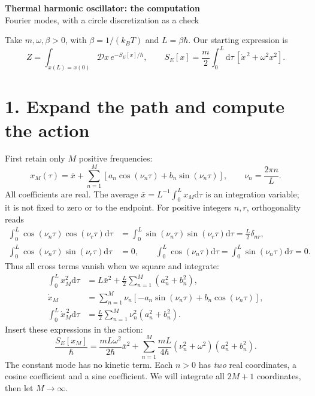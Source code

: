 \documentclass[11pt,letterpaper]{article}
\newcommand{\dd}{\mathrm{d}}
\begin{document}
\begin{center}
{\Large\bfseries Thermal harmonic oscillator: the computation}\\[4pt]
{\large Fourier modes, with a circle discretization as a check}
\end{center}
Take $m,\omega,\beta>0$, with $\beta=1/(k_BT)$ and $L=\beta\hbar$.
Our starting expression is
\begin{equation}
 Z=\int_{x(L)=x(0)}\mathcal D x\,e^{-S_E[x]/\hbar},\qquad
 S_E[x]=\frac m2\int_0^L\dd\tau\,[\dot x^{\,2}+\omega^2x^2].
 \label{eq:action}
\end{equation}
\section*{1. Expand the path and compute the action}
First retain only $M$ positive frequencies:
\begin{equation}
 x_M(\tau)=\bar x+\sum_{n=1}^{M}
 [a_n\cos(\nu_n\tau)+b_n\sin(\nu_n\tau)],\qquad
 \nu_n=\frac{2\pi n}{L}.
\end{equation}
All coefficients are real. The average $\bar x=L^{-1}\int_0^Lx_M\dd\tau$
is an integration variable; it is not fixed to zero or to the endpoint.
For positive integers $n,r$, orthogonality reads
\begin{align*}
 \int_0^L\cos(\nu_n\tau)\cos(\nu_r\tau)\dd\tau
 &=\int_0^L\sin(\nu_n\tau)\sin(\nu_r\tau)\dd\tau
 =\frac L2\delta_{nr},\\
 \int_0^L\cos(\nu_n\tau)\sin(\nu_r\tau)\dd\tau&=0,
 \qquad \int_0^L\cos(\nu_n\tau)\dd\tau
 =\int_0^L\sin(\nu_n\tau)\dd\tau=0.
\end{align*}
Thus all cross terms vanish when we square and integrate:
\begin{align}
 \int_0^Lx_M^2\dd\tau&=L\bar x^2+
                 \frac L2\sum_{n=1}^M(a_n^2+b_n^2),\\
 \dot x_M&=\sum_{n=1}^M\nu_n[-a_n\sin(\nu_n\tau)+b_n\cos(\nu_n\tau)],\\
 \int_0^L\dot x_M^{\,2}\dd\tau&=
                  \frac L2\sum_{n=1}^M\nu_n^2(a_n^2+b_n^2).
\end{align}
Insert these expressions in the action:
\begin{equation}
 \boxed{\frac{S_E[x_M]}{\hbar}=
 \frac{mL\omega^2}{2\hbar}\bar x^2+
 \sum_{n=1}^M\frac{mL}{4\hbar}(\nu_n^2+\omega^2)(a_n^2+b_n^2).}
 \label{eq:fourier-action}
\end{equation}
The constant mode has no kinetic term. Each $n>0$ has \emph{two} real
coordinates, a cosine coefficient and a sine coefficient. We will integrate
all $2M+1$ coordinates, then let $M\to\infty$.
\end{document}

